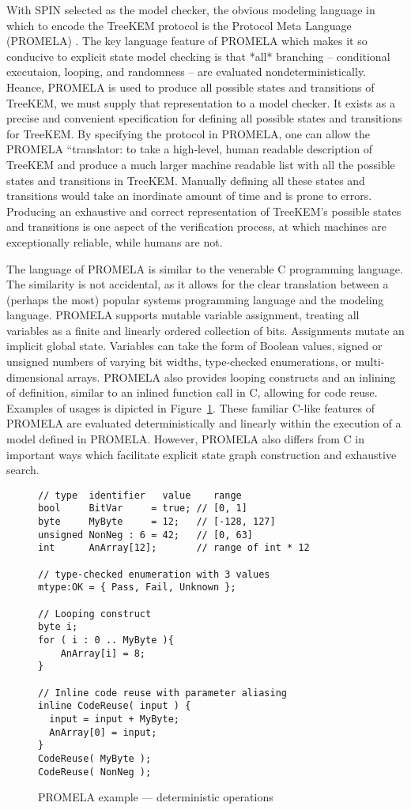 With SPIN selected as the model checker, the obvious modeling language in which to encode the TreeKEM protocol is the Protocol Meta Language (PROMELA) \autocite{holzmann1980basic, holzmann1990design}.
The key language feature of PROMELA which makes it so conducive to explicit state model checking is that *all* branching -- conditional executaion, looping, and randomness -- are evaluated nondeterministically.
Heance, PROMELA is used to produce all possible states and transitions of TreeKEM, we must supply that representation to a model checker.
It exists as a precise and convenient specification for defining all possible states and transitions for TreeKEM.\@
By specifying the protocol in PROMELA, one can allow the PROMELA ``translator: to take a high-level, human readable description of TreeKEM and produce a much larger machine readable list with all the possible states and transitions in TreeKEM.\@
Manually defining all these states and transitions would take an inordinate amount of time and is prone to errors.
Producing an exhaustive and correct representation of TreeKEM's possible states and transitions is one aspect of the verification process, at which machines are exceptionally reliable, while humans are not.

The language of PROMELA is similar to the venerable C programming language.
The similarity is not accidental, as it allows for the clear translation between a (perhaps the most) popular systems programming language and the modeling language.
PROMELA supports mutable variable assignment, treating all variables as a finite and linearly ordered collection of bits.
Assignments mutate an implicit global state.
Variables can take the form of Boolean values, signed or unsigned numbers of varying bit widths, type-checked enumerations, or multi-dimensional arrays.
PROMELA also provides looping constructs and an inlining of definition, similar to an inlined function call in C, allowing for code reuse.
Examples of usages is dipicted in Figure\ \ref{fig:determinism}.
These familiar C-like features of PROMELA are evaluated deterministically and linearly within the execution of a model defined in PROMELA.\@
However, PROMELA also differs from C in important ways which facilitate explicit state graph construction and exhaustive search.

\begin{figure}
\centering
\caption{\label{fig:determinism} PROMELA example --- deterministic operations}
\begin{verbatim}
// type  identifier   value    range
bool     BitVar     = true; // [0, 1]
byte     MyByte     = 12;   // [-128, 127]
unsigned NonNeg : 6 = 42;   // [0, 63]
int      AnArray[12];       // range of int * 12

// type-checked enumeration with 3 values
mtype:OK = { Pass, Fail, Unknown };

// Looping construct
byte i;
for ( i : 0 .. MyByte ){
    AnArray[i] = 8;
}

// Inline code reuse with parameter aliasing
inline CodeReuse( input ) {
  input = input + MyByte;
  AnArray[0] = input;
}
CodeReuse( MyByte );
CodeReuse( NonNeg );
\end{verbatim}
\end{figure}


